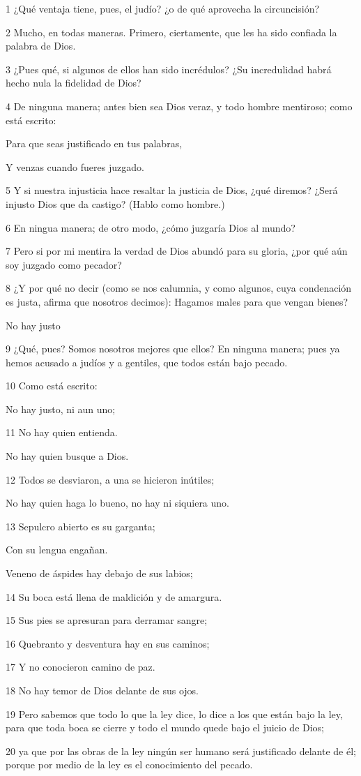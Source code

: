 \par 1 ¿Qué ventaja tiene, pues, el judío? ¿o de qué aprovecha la circuncisión?
\par 2 Mucho, en todas maneras. Primero, ciertamente, que les ha sido confiada la palabra de Dios.
\par 3 ¿Pues qué, si algunos de ellos han sido incrédulos? ¿Su incredulidad habrá hecho nula la fidelidad de Dios?
\par 4 De ninguna manera; antes bien sea Dios veraz, y todo hombre mentiroso; como está escrito:
\par Para que seas justificado en tus palabras,
\par Y venzas cuando fueres juzgado.
\par 5 Y si nuestra injusticia hace resaltar la justicia de Dios, ¿qué diremos? ¿Será injusto Dios que da castigo? (Hablo como hombre.)
\par 6 En ningua manera; de otro modo, ¿cómo juzgaría Dios al mundo?
\par 7 Pero si por mi mentira la verdad de Dios abundó para su gloria, ¿por qué aún soy juzgado como pecador?
\par 8 ¿Y por qué no decir (como se nos calumnia, y como algunos, cuya condenación es justa, afirma que nosotros decimos): Hagamos males para que vengan bienes?
\par No hay justo
\par 9 ¿Qué, pues? Somos nosotros mejores que ellos? En ninguna manera; pues ya hemos acusado a judíos y a gentiles, que todos están bajo pecado.
\par 10 Como está escrito:
\par No hay justo, ni aun uno;
\par 11 No hay quien entienda.
\par No hay quien busque a Dios.
\par 12 Todos se desviaron, a una se hicieron inútiles;
\par No hay quien haga lo bueno, no hay ni siquiera uno.
\par 13 Sepulcro abierto es su garganta;
\par Con su lengua engañan.
\par Veneno de áspides hay debajo de sus labios;
\par 14 Su boca está llena de maldición y de amargura.
\par 15 Sus pies se apresuran para derramar sangre;
\par 16 Quebranto y desventura hay en sus caminos;
\par 17 Y no conocieron camino de paz.
\par 18 No hay temor de Dios delante de sus ojos.
\par 19 Pero sabemos que todo lo que la ley dice, lo dice a los que están bajo la ley, para que toda boca se cierre y todo el mundo quede bajo el juicio de Dios;
\par 20 ya que por las obras de la ley ningún ser humano será justificado delante de él; porque por medio de la ley es el conocimiento del pecado.

